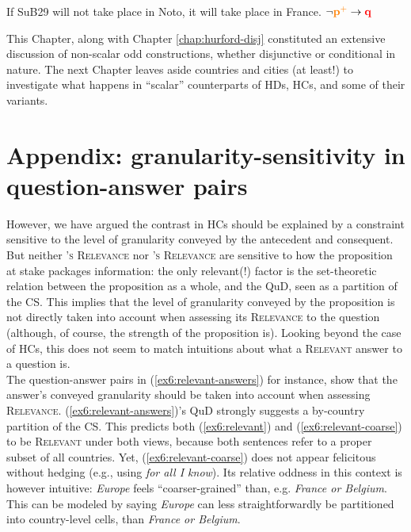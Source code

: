 \begin{exe}
	\ex \label{ex6:hc-disj} {If SuB29 will not take place in Noto, it will take place in France. \hfill $\neg \textbf{\textcolor{orange}{p$^+$}}\rightarrow \textbf{\textcolor{red}{q}}$}
\end{exe}

This Chapter, along with Chapter \ref{chap:hurford-disj} constituted an extensive discussion of non-scalar odd constructions, whether disjunctive or conditional in nature. The next Chapter leaves aside countries and cities (at least!) to investigate what happens in ``scalar'' counterparts of HDs, HCs, and some of their variants. 
\newpage

\section{Appendix: granularity-sensitivity in question-answer pairs}

However, we have argued the contrast in HCs should be explained by a constraint sensitive to the level of granularity conveyed by the antecedent and consequent. But neither \textsc{\citeauthor{Lewis1988}'s Relevance} nor \textsc{\citeauthor{Roberts2012}'s Relevance} are sensitive to how the proposition at stake packages information: the only relevant(!) factor is the set-theoretic relation between the proposition as a whole, and the QuD, seen as a partition of the CS. This implies that the level of granularity conveyed by the proposition is not directly taken into account when assessing its \textsc{Relevance} to the question (although, of course, the strength of the proposition is). Looking beyond the case of HCs, this does not seem to match intuitions about what a \textsc{Relevant} answer to a question is.\\

The question-answer pairs in (\ref{ex6:relevant-answers}) for instance, show that the answer's conveyed granularity should be taken into account when assessing \textsc{Relevance}. (\ref{ex6:relevant-answers})'s QuD strongly suggests a by-country partition of the CS. This predicts both (\ref{ex6:relevant}) and (\ref{ex6:relevant-coarse}) to be \textsc{Relevant} under both views, because both sentences refer to a proper subset of all countries. Yet, (\ref{ex6:relevant-coarse}) does not appear felicitous without hedging (e.g., using \textit{for all I know}). Its relative oddness in this context is however intuitive: \textit{Europe} feels ``coarser-grained'' than, e.g. \textit{France or Belgium}. This can be modeled by saying \textit{Europe} can less straightforwardly be partitioned into country-level cells, than \textit{France or Belgium}. 

